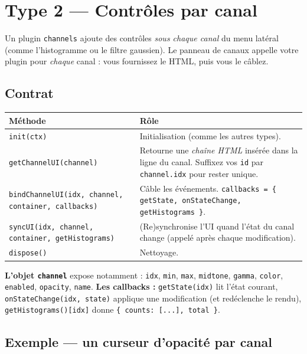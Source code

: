 \documentclass[11pt,a4paper]{article}
\newcommand{\code}[1]{\texttt{#1}}
\begin{document}
\section{Type 2 --- Contrôles par canal}

Un plugin \code{channels} ajoute des contrôles \emph{sous chaque canal} du menu
latéral (comme l'histogramme ou le filtre gaussien). Le panneau de canaux appelle
votre plugin pour \emph{chaque} canal : vous fournissez le HTML, puis vous le
câblez.

\subsection{Contrat}

\begin{center}
\begin{tabularx}{\linewidth}{@{}l X@{}}
\toprule
\textbf{Méthode} & \textbf{Rôle} \\
\midrule
\code{init(ctx)} & Initialisation (comme les autres types). \\
\code{getChannelUI(channel)} & Retourne une \emph{chaîne HTML} insérée dans la
  ligne du canal. Suffixez vos \code{id} par \code{channel.idx} pour rester unique. \\
\code{bindChannelUI(idx, channel, container, callbacks)} & Câble les événements.
  \code{callbacks = \{ getState, onStateChange, getHistograms \}}. \\
\code{syncUI(idx, channel, container, getHistograms)} & (Re)synchronise l'UI quand
  l'état du canal change (appelé après chaque modification). \\
\code{dispose()} & Nettoyage. \\
\bottomrule
\end{tabularx}
\end{center}

\noindent\textbf{L'objet \code{channel}} expose notamment :
\code{idx}, \code{min}, \code{max}, \code{midtone}, \code{gamma}, \code{color},
\code{enabled}, \code{opacity}, \code{name}. \textbf{Les callbacks :}
\code{getState(idx)} lit l'état courant, \code{onStateChange(idx, state)}
applique une modification (et redéclenche le rendu),
\code{getHistograms()[idx]} donne \code{\{ counts: [...], total \}}.

\subsection{Exemple --- un curseur d'opacité par canal}
\end{document}
